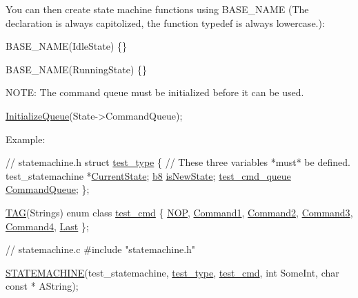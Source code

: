 You can then create state machine functions using {\ttfamily B\+A\+S\+E\+\_\+\+N\+A\+ME} (The declaration is always capitolized, the function typedef is always lowercase.)\+: 
\begin{DoxyCode}
BASE\_NAME(IdleState)
\{\}

BASE\_NAME(RunningState)
\{\}
\end{DoxyCode}


N\+O\+TE\+: The command queue must be initialized before it can be used. 
\begin{DoxyCode}
\hyperlink{Generated__Test_8h_a3ee2f2be736dcd0ff7e75d6ff8d2e6d5}{InitializeQueue}(State->CommandQueue);
\end{DoxyCode}


Example\+: 
\begin{DoxyCode}
\textcolor{comment}{// statemachine.h}
\textcolor{keyword}{struct }\hyperlink{structtest__type}{test\_type}
\{
    \textcolor{comment}{// These three variables *must* be defined.}
    test\_statemachine *\hyperlink{structtest__type_a48139457e16e23a57531e5af02be7f14}{CurrentState};
    \hyperlink{ab__common_8h_a70e369648385b50f2d0588e8e8745275}{b8} \hyperlink{structtest__type_a36eb3041ef1341aec27a2a2d98500ce6}{isNewState};
    \hyperlink{structtest__cmd__queue}{test\_cmd\_queue} \hyperlink{structtest__type_a9ef32b05c6f8a712062f8261d71665ca}{CommandQueue};
\};

\hyperlink{ParsedC_8h_a542930d5f2f117ff1e21206f2baa51c5ae444f73956e5b2a401eb9471db89e7c9}{TAG}(Strings)
\textcolor{keyword}{enum class} \hyperlink{PreprocTest_8h_a55ed691059222a58555cf9992ec14431}{test\_cmd}
\{
    \hyperlink{ain__machine_8h_a128a1796cd4d95a8e92ed32e492fffb2a1a004f5abe2b334db21328be1ea6b593}{NOP},
    \hyperlink{PreprocTest_8h_a55ed691059222a58555cf9992ec14431a1ed25d14e3a228b0089b334bdbca5769}{Command1},
    \hyperlink{PreprocTest_8h_a55ed691059222a58555cf9992ec14431a0c33f49f722805e5a6f6f759b491fa2a}{Command2},
    \hyperlink{PreprocTest_8h_a55ed691059222a58555cf9992ec14431a732a6c81e81f68d48d63e795bd06ab22}{Command3},
    \hyperlink{PreprocTest_8h_a55ed691059222a58555cf9992ec14431aeb4001380fa7b2b0c963a882c2305280}{Command4},
    \hyperlink{PreprocTest_8h_a55ed691059222a58555cf9992ec14431ad55b30607c2a9a2616347d6edb789f6b}{Last}
\};

\textcolor{comment}{// statemachine.c}
\textcolor{preprocessor}{#include "statemachine.h"}

\hyperlink{Generated__001_8h_ad16363f6583678566864d70afebc6a41}{STATEMACHINE}(test\_statemachine, \hyperlink{structtest__type}{test\_type}, \hyperlink{PreprocTest_8h_a55ed691059222a58555cf9992ec14431}{test\_cmd}, \textcolor{keywordtype}{int} SomeInt, \textcolor{keywordtype}{char} \textcolor{keyword}{const} *
      AString);


\end{DoxyCode}
